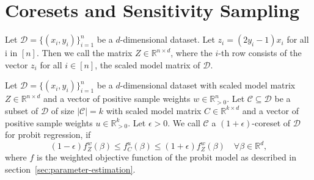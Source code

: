 \section{Coresets and Sensitivity Sampling}

\begin{definition}
    Let $\mathcal{D}=\{(x_i, y_i)\}_{i=1}^n$ be a $d$-dimensional dataset.
    Let $z_i = (2y_i - 1)x_i$ for all i in $[n]$.
    Then we call the matrix $Z \in \mathbb{R}^{n \times d}$, where the
    $i$-th row consists of the vector $z_i$ for all $i \in [n]$,
    the scaled model matrix of $\mathcal{D}$.
\end{definition}

\begin{definition}[Coreset]
    Let $\mathcal{D}=\{(x_i, y_i)\}_{i=1}^n$ be a $d$-dimensional dataset
    with scaled model matrix $Z \in \mathbb{R}^{n \times d}$ and
    a vector of positive sample weights $w \in \mathbb{R}_{>0}^n$.
    Let $\mathcal{C} \subseteq \mathcal{D}$ be a subset of $\mathcal{D}$
    of size $|\mathcal{C}| = k$
    with scaled model matrix $C \in \mathbb{R}^{k \times d}$ and
    a vector of positive sample weights $u \in \mathbb{R}_{>0}^k$.
    Let $\epsilon > 0$.
    We call $\mathcal{C}$ a $(1+\epsilon)$-coreset of $\mathcal{D}$
    for probit regression, if
    \begin{equation*}
        (1-\epsilon)f_Z^w(\beta) \leq f_C^u(\beta) \leq (1+\epsilon)f_Z^w(\beta)
        \quad \forall \beta \in \mathbb{R}^d,
    \end{equation*}
    where $f$ is the weighted objective function of
    the probit model as described in section~\ref{sec:parameter-estimation}.
\end{definition}